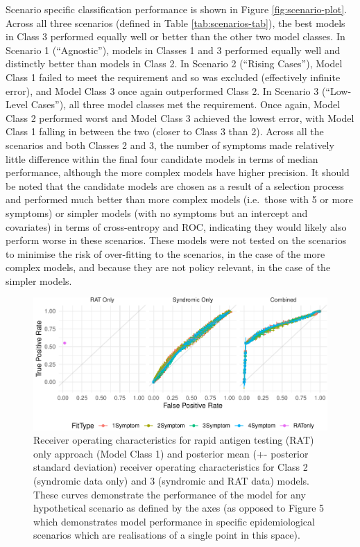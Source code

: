 \documentclass[]{elsarticle} %
\begin{document}
Scenario specific classification performance is shown in Figure \ref{fig:scenario-plot}.
Across all three scenarios (defined in Table \ref{tab:scenarios-tab}), the best models in Class 3 performed equally well or better than the other two model classes.
In Scenario 1 (``Agnostic''), models in Classes 1 and 3 performed equally well and distinctly better than models in Class 2.
In Scenario 2 (``Rising Cases''), Model Class 1 failed to meet the requirement and so was excluded (effectively infinite error), and Model Class 3 once again outperformed Class 2.
In Scenario 3 (``Low-Level Cases''), all three model classes met the requirement.
Once again, Model Class 2 performed worst and Model Class 3 achieved the lowest error, with Model Class 1 falling in between the two (closer to Class 3 than 2).
Across all the scenarios and both Classes 2 and 3, the number of symptoms made relatively little difference within the final four candidate models in terms of median performance, although the more complex models have higher precision.
It should be noted that the candidate models are chosen as a result of a selection process and performed much better than more complex models (i.e.~those with 5 or more symptoms) or simpler models (with no symptoms but an intercept and covariates) in terms of cross-entropy and ROC, indicating they would likely also perform worse in these scenarios.
These models were not tested on the scenarios to minimise the risk of over-fitting to the scenarios, in the case of the more complex models, and because they are not policy relevant, in the case of the simpler models.

\begin{figure}
\centering
\includegraphics{0501_MainText_files/figure-latex/ROC-plot-1.pdf}
\caption{\label{fig:ROC-plot} Receiver operating characteristics for rapid antigen testing (RAT) only approach (Model Class 1) and posterior mean (+- posterior standard deviation) receiver operating characteristics for Class 2 (syndromic data only) and 3 (syndromic and RAT data) models. These curves demonstrate the performance of the model for any hypothetical scenario as defined by the axes (as opposed to Figure 5 which demonstrates model performance in specific epidemiological scenarios which are realisations of a single point in this space).}
\end{figure}
\end{document}
